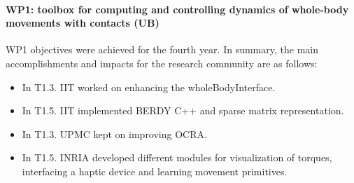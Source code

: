 

\paragraph*{WP1: toolbox for computing and controlling dynamics of whole-body movements with contacts (UB)}

WP1 objectives were achieved for the fourth year.  In summary, the main
accomplishments and impacts for the research community are as follows:

\begin{itemize}
  
\item In T1.3. IIT worked on enhancing the wholeBodyInterface.
\item In T1.5. IIT implemented BERDY C++ and sparse matrix representation.
\item In T1.3. UPMC kept on improving OCRA. 
\item In T1.5. INRIA developed different modules for visualization of torques,
  interfacing a haptic device and learning movement primitives.

\end{itemize}

